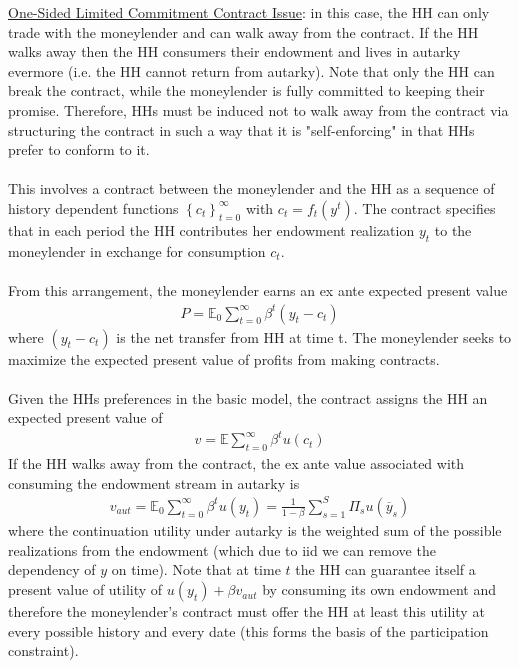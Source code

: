 \documentclass{article}
\begin{document}
\vspace{2.5mm}
\par \underline{One-Sided Limited Commitment Contract Issue}: in this case, the HH can only trade with the moneylender and can walk away from the contract. If the HH walks away then the HH consumers their endowment and lives in autarky evermore (i.e. the HH cannot return from autarky). Note that only the HH can break the contract, while the moneylender is fully committed to keeping their promise. Therefore, HHs must be induced not to walk away from the contract via structuring the contract in such a way that it is "self-enforcing" in that HHs prefer to conform to it. \\ \\
This involves a contract between the moneylender and the HH as a sequence of history dependent functions $\left\{c_{t}\right\}_{t=0}^{\infty}$ with $c_{t} = f_{t} (y^{t})$. The contract specifies that in each period the HH contributes her endowment realization $y_{t}$ to the moneylender in exchange for consumption $c_{t}$. \\ \\
From this arrangement, the moneylender earns an ex ante expected present value
\begin{gather*}
    P = \mathbb{E}_{0} \sum_{t=0}^{\infty} \beta^{t} (y_{t} - c_{t})
\end{gather*}
where $(y_{t} - c_{t})$ is the net transfer from HH at time t. The moneylender seeks to maximize the expected present value of profits from making contracts. \\ \\
Given the HHs preferences in the basic model, the contract assigns the HH an expected present value of
\begin{gather*}
    v = \mathbb{E} \sum_{t=0}^{\infty} \beta^{t} u(c_{t})
\end{gather*}
If the HH walks away from the contract, the ex ante value associated with consuming the endowment stream in autarky is
\begin{gather*}
    v_{aut} = \mathbb{E}_{0} \sum_{t=0}^{\infty} \beta^{t} u(y_{t}) = \frac{1}{1-\beta} \sum_{s=1}^{S} \Pi_{s} u(\overline{y}_{s})
\end{gather*}
where the continuation utility under autarky is the weighted sum of the possible realizations from the endowment (which due to iid we can remove the dependency of $y$ on time). Note that at time $t$ the HH can guarantee itself a present value of utility of $u(y_{t}) + \beta v_{aut}$ by consuming its own endowment and therefore the moneylender's contract must offer the HH at least this utility at every possible history and every date (this forms the basis of the participation constraint). \\ \\
\end{document}
